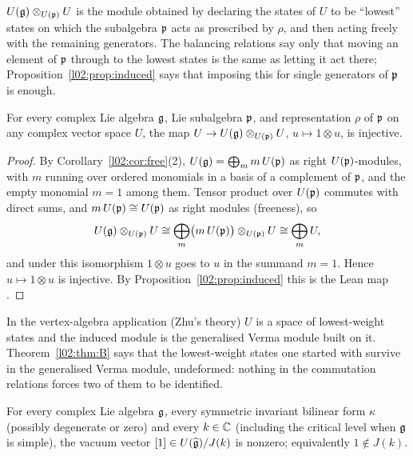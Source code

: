 \begin{physics}
$U(\mathfrak{g})\otimes_{U(\mathfrak{p})}U$ is the module obtained by declaring the states of $U$ to be ``lowest''
states on which the subalgebra $\mathfrak{p}$ acts as prescribed by $\rho$, and then acting freely with the
remaining generators. The balancing relations say only that moving an element of $\mathfrak{p}$ through to the
lowest states is the same as letting it act there; Proposition~\ref{l02:prop:induced} says that imposing
this for single generators of $\mathfrak{p}$ is enough.
\end{physics}

\begin{theorem}\label{l02:thm:B}
For every complex Lie algebra $\mathfrak{g}$, Lie subalgebra $\mathfrak{p}$, and representation $\rho$ of $\mathfrak{p}$ on
any complex vector space $U$, the map $U\to U(\mathfrak{g})\otimes_{U(\mathfrak{p})}U$, $u\mapsto 1\otimes u$, is
injective.
\end{theorem}

\begin{proof}
By Corollary~\ref{l02:cor:free}(2), $U(\mathfrak{g}) = \bigoplus_m m\,U(\mathfrak{p})$ as right $U(\mathfrak{p})$-modules,
with $m$ running over ordered monomials in a basis of a complement of $\mathfrak{p}$, and the empty
monomial $m=1$ among them. Tensor product over $U(\mathfrak{p})$ commutes with direct sums, and
$m\,U(\mathfrak{p})\cong U(\mathfrak{p})$ as right modules (freeness), so
\begin{equation*}
 U(\mathfrak{g})\otimes_{U(\mathfrak{p})}U \cong \bigoplus_m \bigl(m\,U(\mathfrak{p})\bigr)\otimes_{U(\mathfrak{p})}U\cong\bigoplus_m U,
\end{equation*}
and under this isomorphism $1\otimes u$ goes to $u$ in the summand $m=1$. Hence $u\mapsto 1\otimes u$
is injective. By Proposition~\ref{l02:prop:induced} this is the Lean map .
\end{proof}

\begin{physics}
In the vertex-algebra application (Zhu's theory) $U$ is a space of lowest-weight states and the induced
module is the generalised Verma module built on it. Theorem~\ref{l02:thm:B} says that the lowest-weight
states one started with survive in the generalised Verma module, undeformed: nothing in the commutation
relations forces two of them to be identified.
\end{physics}

\begin{theorem}\label{l02:thm:A}
For every complex Lie algebra $\mathfrak{g}$, every symmetric invariant bilinear form $\kappa$ (possibly
degenerate or zero) and every $k\in{\mathbb{C}}$ (including the critical level when $\mathfrak{g}$ is simple), the
vacuum vector $[1]\in U(\widehat{\mathfrak{g}})/J(k)$ is nonzero; equivalently $1\notin J(k)$.
\end{theorem}

